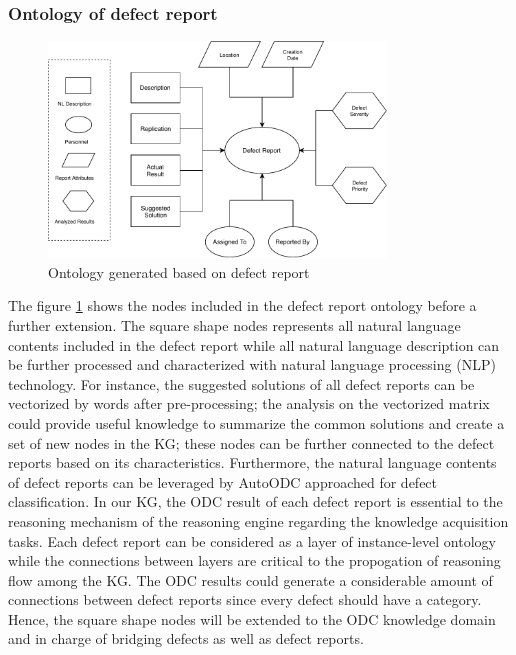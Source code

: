 \documentclass[12pt] {article}
\begin{document}
\subsubsection{Ontology of defect report}
\begin{figure}[h]
    \centering
    \includegraphics[width=0.8\textwidth]{../figures/OntologyOfDefectReport.pdf}
    \caption{Ontology generated based on defect report}
    \label{fig:defectreport}
\end{figure}
The figure \ref{fig:defectreport} shows the nodes included in the defect report ontology before a further extension.
The square shape nodes represents all natural language contents included in the defect report while all natural language description can be further processed and characterized with natural language processing (NLP) technology.
For instance, the suggested solutions of all defect reports can be vectorized by words after pre-processing; the analysis on the vectorized matrix could provide useful knowledge to summarize the common solutions and create a set of new nodes in the KG; these nodes can be further connected to the defect reports based on its characteristics. 
Furthermore, the natural language contents of defect reports can be leveraged by AutoODC approached for defect classification.
In our KG, the ODC result of each defect report is essential to the reasoning mechanism of the reasoning engine regarding the knowledge acquisition tasks.
Each defect report can be considered as a layer of instance-level ontology while the connections between layers are critical to the propogation of reasoning flow among the KG. 
The ODC results could generate a considerable amount of connections between defect reports since every defect should have a category.
Hence, the square shape nodes will be extended to the ODC knowledge domain and in charge of bridging defects as well as defect reports.\par
\end{document}
